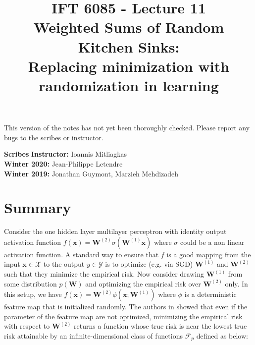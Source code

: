 \documentclass{article}
\title{
    IFT 6085 - Lecture 11 \\ 
    Weighted Sums of Random Kitchen Sinks:\\ Replacing minimization with randomization in learning
}
\date{}
\begin{document}
 


    \maketitle
    
    
    \vspace{-0.5in}
    
    
    \begin{center}
        This version of the notes has not yet been thoroughly checked.
        Please report any bugs to the scribes or instructor.
    \end{center}


    \vspace{0.2in}


    \textbf{Scribes}\hfill
    \textbf{Instructor:}  Ioannis Mitliagkas\\
    \textbf{Winter 2020:} Jean-Philippe Letendre\\
    \textbf{Winter 2019:} Jonathan Guymont, Marzieh Mehdizadeh\\


    \newcommand{\infgc}{\inf_{g \in \mathcal{C}}}
    \newcommand{\supgc}{\sup_{g \in \mathcal{C}}}
    
    \newcommand{\Prob}{\mathbb{P}}
    \newcommand{\E}{\mathbb{E}}
    \newcommand{\reals}{\mathbb{R}}
    \newcommand{\real}{\mathbb{R}}
    \newcommand{\nat}{\mathbb{N}}
    \newcommand{\der}{\mathrm{d}}
    \newcommand{\soft}{\mathrm{softmax}}

    
    \section{Summary}
    Consider the one hidden layer multilayer perceptron with identity output activation function $f(\mathbf{x})=\mathbf{W}^{(2)}\sigma(\mathbf{W}^{(1)}\mathbf{x})$ where $\sigma$ could be a non linear activation function. A standard way to ensure that $f$ is a good mapping from the input $\mathbf{x}\in \mathcal{X}$ to the output $y\in \mathcal{Y}$ is to optimize (e.g. via SGD) $\mathbf{W}^{(1)}$ and $\mathbf{W}^{(2)}$ such that they minimize the empirical risk. Now consider drawing $\mathbf{W}^{(1)}$ from some distribution $p(\mathbf{W})$ and optimizing the empirical risk over $\mathbf{W}^{(2)}$ only. In this setup, we have $f(\mathbf{x})=\mathbf{W}^{(2)}\phi(\mathbf{x};\mathbf{W}^{(1)})$ where $\phi$ is a deterministic feature map that is initialized randomly. The authors in \cite{NIPS2008_3495} showed that even if the parameter of the feature map are not optimized, minimizing the empirical risk with respect to $\mathbf{W}^{(2)}$ returns a  function whose true risk is near the lowest true risk attainable by an infinite-dimensional class of functions $\mathcal{F}_p$ defined as below: 
    
\end{document}
